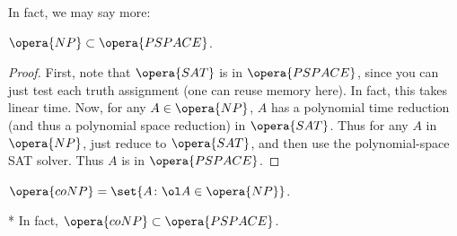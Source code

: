 In fact, we may say more:

\begin{thm}
	$\opera{NP}\subset \opera{PSPACE}$.
\end{thm}

\begin{proof}
	First, note that $\opera{SAT}$ is in $\opera{PSPACE}$, since you can just test each truth assignment (one can reuse memory here). In fact, this takes linear time.
	Now, for any $A\in \opera{NP}$, $A$ has a polynomial time reduction (and thus a polynomial space reduction) in $\opera{SAT}$.
	Thus for any $A$ in $\opera{NP}$, just reduce to $\opera{SAT}$, and then use the polynomial-space SAT solver. Thus $A$ is in $\opera{PSPACE}$.
\end{proof}

\begin{defn}
	$\opera{coNP} = \set{A\colon \ol A \in \opera{NP}}$. 
\end{defn}

\begin{fact}*
	In fact, $\opera{coNP} \subset \opera{PSPACE}$.
\end{fact}
